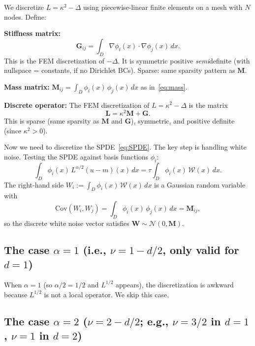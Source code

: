 \documentclass[11pt]{article}
\newcommand{\bM}{\mathbf{M}}
\newcommand{\bL}{\mathbf{L}}
\begin{document}
We discretize $L = \kappa^2 - \Delta$ using piecewise-linear finite elements on a mesh with $N$ nodes.  Define:

\medskip\noindent\textbf{Stiffness matrix:}
\begin{equation}\label{eq:stiffness}
  \mathbf{G}_{ij} = \int_D \nabla \phi_i(x) \cdot \nabla \phi_j(x)\, dx.
\end{equation}
This is the FEM discretization of $-\Delta$.  It is symmetric positive \emph{semi}definite (with nullspace = constants, if no Dirichlet BCs).  Sparse: same sparsity pattern as $\bM$.

\medskip\noindent\textbf{Mass matrix:} $\bM_{ij} = \int_D \phi_i(x)\, \phi_j(x)\, dx$ as in~\eqref{eq:mass}.

\medskip\noindent\textbf{Discrete operator:}  The FEM discretization of $L = \kappa^2 - \Delta$ is the matrix
\begin{equation}\label{eq:Lh}
  \bL = \kappa^2 \bM + \mathbf{G}.
\end{equation}
This is sparse (same sparsity as $\bM$ and $\mathbf{G}$), symmetric, and positive definite (since $\kappa^2 > 0$).

\medskip
Now we need to discretize the SPDE~\eqref{eq:SPDE}.  The key step is handling white noise.  Testing the SPDE against basis functions $\phi_i$:
\[
  \int_D \phi_i(x)\, L^{\alpha/2}(u-m)(x)\, dx = \tau \int_D \phi_i(x)\, \mathcal{W}(x)\, dx.
\]
The right-hand side $W_i := \int_D \phi_i(x)\, \mathcal{W}(x)\, dx$ is a Gaussian random variable with
\[
  \text{Cov}(W_i, W_j) = \int_D \phi_i(x)\, \phi_j(x)\, dx = \bM_{ij},
\]
so the discrete white noise vector satisfies $\mathbf{W} \sim \mathcal{N}(0, \bM)$.

\subsection{The case $\alpha = 1$ (i.e., $\nu = 1 - d/2$, only valid for $d = 1$)}\label{sec:alpha1}

When $\alpha = 1$ (so $\alpha/2 = 1/2$ and $L^{1/2}$ appears), the discretization is awkward because $L^{1/2}$ is not a local operator.  We skip this case.

\subsection{The case $\alpha = 2$ ($\nu = 2 - d/2$; e.g., $\nu = 3/2$ in $d=1$, $\nu = 1$ in $d=2$)}\label{sec:alpha2}
\end{document}
